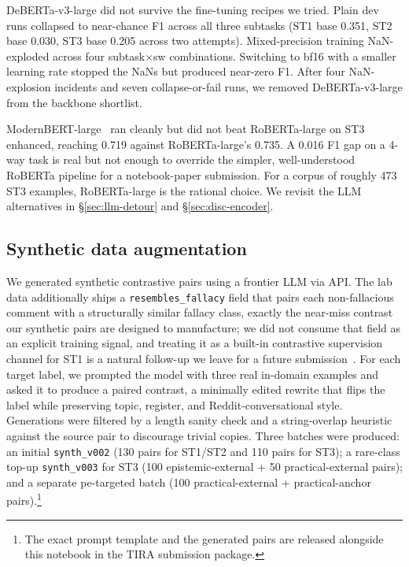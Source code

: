 DeBERTa-v3-large did not survive the fine-tuning recipes we tried. Plain dev runs collapsed to near-chance F1 across all three subtasks (ST1 base 0.351, ST2 base 0.030, ST3 base 0.205 across two attempts). %
Mixed-precision training NaN-exploded across four subtask$\times$sw combinations. Switching to bf16 with a smaller learning rate stopped the NaNs but produced near-zero F1. %
After four NaN-explosion incidents and seven collapse-or-fail runs, we removed DeBERTa-v3-large from the backbone shortlist.

ModernBERT-large~\cite{warner2024modernbert} ran cleanly but did not beat RoBERTa-large on ST3 enhanced, reaching 0.719 against RoBERTa-large's 0.735. %
A 0.016 F1 gap on a 4-way task is real but not enough to override the simpler, well-understood RoBERTa pipeline for a notebook-paper submission. For a corpus of roughly 473 ST3 examples, RoBERTa-large is the rational choice. We revisit the LLM alternatives in \S\ref{sec:llm-detour} and \S\ref{sec:disc-encoder}.

\subsection{Synthetic data augmentation}
\label{sec:synth}

We generated synthetic contrastive pairs using a frontier LLM via API. The lab data additionally ships a \texttt{resembles\_fallacy} field that pairs each non-fallacious comment with a structurally similar fallacy class, exactly the near-miss contrast our synthetic pairs are designed to manufacture; we did not consume that field as an explicit training signal, and treating it as a built-in contrastive supervision channel for ST1 is a natural follow-up we leave for a future submission~\cite{kiesel:2026c}. For each target label, we prompted the model with three real in-domain examples and asked it to produce a paired contrast, a minimally edited rewrite that flips the label while preserving topic, register, and Reddit-conversational style. Generations were filtered by a length sanity check and a string-overlap heuristic against the source pair to discourage trivial copies. Three batches were produced: an initial \texttt{synth\_v002} (130 pairs for ST1/ST2 and 110 pairs for ST3); a rare-class top-up \texttt{synth\_v003} for ST3 (100 epistemic-external + 50 practical-external pairs); and a separate \textsf{pe}-targeted batch (100 practical-external + practical-anchor pairs).\footnote{The exact prompt template and the generated pairs are released alongside this notebook in the TIRA submission package.} %

